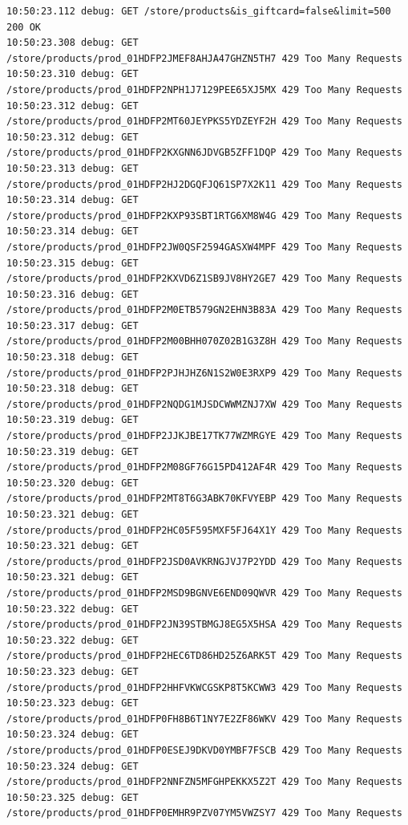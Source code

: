 \begin{listing}[p]
    \begin{verbatim}
10:50:23.112 debug: GET /store/products&is_giftcard=false&limit=500 200 OK
10:50:23.308 debug: GET /store/products/prod_01HDFP2JMEF8AHJA47GHZN5TH7 429 Too Many Requests
10:50:23.310 debug: GET /store/products/prod_01HDFP2NPH1J7129PEE65XJ5MX 429 Too Many Requests
10:50:23.312 debug: GET /store/products/prod_01HDFP2MT60JEYPKS5YDZEYF2H 429 Too Many Requests
10:50:23.312 debug: GET /store/products/prod_01HDFP2KXGNN6JDVGB5ZFF1DQP 429 Too Many Requests
10:50:23.313 debug: GET /store/products/prod_01HDFP2HJ2DGQFJQ61SP7X2K11 429 Too Many Requests
10:50:23.314 debug: GET /store/products/prod_01HDFP2KXP93SBT1RTG6XM8W4G 429 Too Many Requests
10:50:23.314 debug: GET /store/products/prod_01HDFP2JW0QSF2594GASXW4MPF 429 Too Many Requests
10:50:23.315 debug: GET /store/products/prod_01HDFP2KXVD6Z1SB9JV8HY2GE7 429 Too Many Requests
10:50:23.316 debug: GET /store/products/prod_01HDFP2M0ETB579GN2EHN3B83A 429 Too Many Requests
10:50:23.317 debug: GET /store/products/prod_01HDFP2M00BHH070Z02B1G3Z8H 429 Too Many Requests
10:50:23.318 debug: GET /store/products/prod_01HDFP2PJHJHZ6N1S2W0E3RXP9 429 Too Many Requests
10:50:23.318 debug: GET /store/products/prod_01HDFP2NQDG1MJSDCWWMZNJ7XW 429 Too Many Requests
10:50:23.319 debug: GET /store/products/prod_01HDFP2JJKJBE17TK77WZMRGYE 429 Too Many Requests
10:50:23.319 debug: GET /store/products/prod_01HDFP2M08GF76G15PD412AF4R 429 Too Many Requests
10:50:23.320 debug: GET /store/products/prod_01HDFP2MT8T6G3ABK70KFVYEBP 429 Too Many Requests
10:50:23.321 debug: GET /store/products/prod_01HDFP2HC05F595MXF5FJ64X1Y 429 Too Many Requests
10:50:23.321 debug: GET /store/products/prod_01HDFP2JSD0AVKRNGJVJ7P2YDD 429 Too Many Requests
10:50:23.321 debug: GET /store/products/prod_01HDFP2MSD9BGNVE6END09QWVR 429 Too Many Requests
10:50:23.322 debug: GET /store/products/prod_01HDFP2JN39STBMGJ8EG5X5HSA 429 Too Many Requests
10:50:23.322 debug: GET /store/products/prod_01HDFP2HEC6TD86HD25Z6ARK5T 429 Too Many Requests
10:50:23.323 debug: GET /store/products/prod_01HDFP2HHFVKWCGSKP8T5KCWW3 429 Too Many Requests
10:50:23.323 debug: GET /store/products/prod_01HDFP0FH8B6T1NY7E2ZF86WKV 429 Too Many Requests
10:50:23.324 debug: GET /store/products/prod_01HDFP0ESEJ9DKVD0YMBF7FSCB 429 Too Many Requests
10:50:23.324 debug: GET /store/products/prod_01HDFP2NNFZN5MFGHPEKKX5Z2T 429 Too Many Requests
10:50:23.325 debug: GET /store/products/prod_01HDFP0EMHR9PZV07YM5VWZSY7 429 Too Many Requests

\end{verbatim}
\end{listing}
